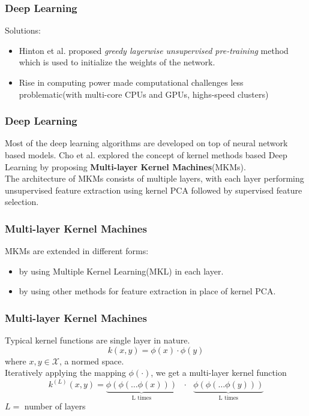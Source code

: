 \documentclass[a4paper,compress,svgnames]{beamer}
\begin{document}
\begin{frame}
\frametitle{Deep Learning}
Solutions:\\
\vspace{0.2in}
\begin{itemize}
\setlength\itemsep{1em}
\item Hinton et al. proposed \textit{greedy layerwise unsupervised pre-training} method which is used to initialize the weights of the network.
\item Rise in computing power made computational challenges less problematic(with multi-core CPUs and GPUs, highs-speed clusters)
\end{itemize}
\end{frame}

\begin{frame}
\frametitle{Deep Learning}
Most of the deep learning algorithms are developed on top of neural network based models. Cho et al. explored the concept of kernel methods based Deep Learning by proposing \textbf{Multi-layer Kernel Machines}(MKMs).\\
\vspace{0.2in}
The architecture of MKMs consists of multiple layers, with each layer performing unsupervised feature extraction using kernel PCA followed by supervised feature selection.\\
\end{frame}

\begin{frame}
\frametitle{Multi-layer Kernel Machines}
MKMs are extended in different forms:\\
\vspace{0.2in}
\begin{itemize}
\setlength\itemsep{1em}
\item by using Multiple Kernel Learning(MKL) in each layer.
\item by using other methods for feature extraction in place of kernel PCA.
\end{itemize}
\end{frame}

\begin{frame}
\frametitle{Multi-layer Kernel Machines}
Typical kernel functions are single layer in nature.
\[  k(x,y) = \phi(x) \cdot \phi(y) \]
where $x, y \in \mathcal{X}$, a normed space.\\
\vspace{0.2in}
Iteratively applying the mapping $\phi(\cdot)$, we get a multi-layer kernel function
\[ k^{(L)}(x,y) = \underbrace{\phi(\phi(\ldots \phi(x)))}_{\textrm{L times}} \textrm{ } \cdot \textrm{ } \underbrace{\phi(\phi(\ldots \phi(y)))}_{\textrm{L times}} \]
$L = $ number of layers
\end{frame}
\end{document}
